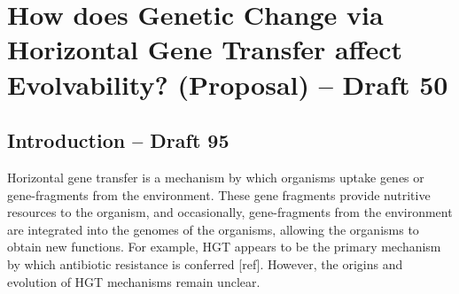 \section{How does Genetic Change via Horizontal Gene Transfer affect Evolvability? (Proposal) – Draft 50}
\subsection{Introduction – Draft 95}

Horizontal gene transfer is a mechanism by which organisms uptake genes or gene-fragments from the environment.  These gene fragments provide nutritive resources to the organism, and occasionally, gene-fragments from the environment are integrated into the genomes of the organisms, allowing the organisms to obtain new functions. For example, HGT appears to be the primary mechanism by which antibiotic resistance is conferred [ref]. However, the origins and evolution of HGT mechanisms remain unclear. 
